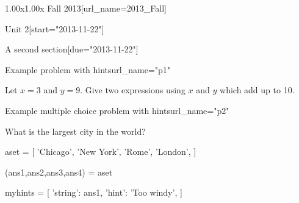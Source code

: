 \documentclass[12pt]{article}
\begin{document}
\begin{edXcourse}{1.00x}{1.00x Fall 2013}[url_name=2013_Fall]
\begin{edXchapter}{Unit 2}[start="2013-11-22"]
\begin{edXsection}{A second section}[due="2013-11-22"]
\begin{edXproblem}{Example problem with hints}{url_name="p1"}
 
Let $x=3$ and $y=9$.  Give two expressions using $x$ and $y$ which add
up to 10.



\end{edXproblem}


\begin{edXproblem}{Example multiple choice problem with hints}{url_name="p2"}
 
What is the largest city in the world?

\begin{edXscript}
aset = [ 'Chicago',
         'New York',
         'Rome',
         'London',
      ]

(ans1,ans2,ans3,ans4) = aset

myhints = [ {'string': ans1, 'hint': 'Too windy'},
          ]
  
\end{edXscript}


\end{edXproblem}


\end{edXsection}
\end{edXchapter}
\end{edXcourse}

\end{document}
